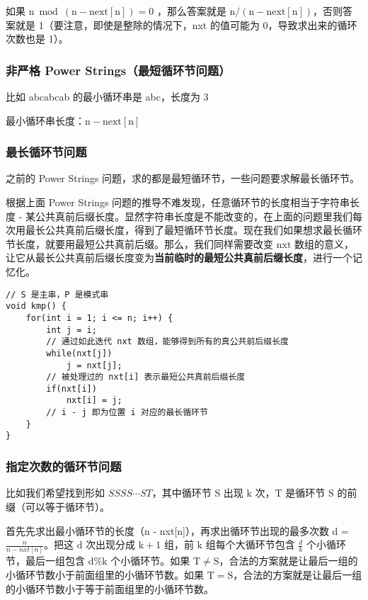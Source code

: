 \documentclass[UTF8]{article}
\begin{document}
如果 $\mathrm{n \bmod (n - next[n]) = 0}$  ，那么答案就是 $\mathrm{n / (n - next[n])}$，否则答案就是 1（要注意，即使是整除的情况下，nxt 的值可能为 0，导致求出来的循环次数也是 1）。

\subsubsection{非严格 Power Strings（最短循环节问题）}
比如 abcabcab 的最小循环串是 abc，长度为 $\mathrm{3}$

最小循环串长度：$\mathrm{n-next[n]}$

\subsubsection{最长循环节问题}
之前的 Power Strings 问题，求的都是最短循环节，一些问题要求解最长循环节。

根据上面 Power Strings 问题的推导不难发现，任意循环节的长度相当于字符串长度 - 某公共真前后缀长度。显然字符串长度是不能改变的，在上面的问题里我们每次用最长公共真前后缀长度，得到了最短循环节长度。现在我们如果想求最长循环节长度，就要用最短公共真前后缀。那么，我们同样需要改变 $\mathrm{nxt}$ 数组的意义，让它从最长公共真前后缀长度变为\textbf{当前临时的最短公共真前后缀长度}，进行一个记忆化。

\begin{lstlisting}[caption=最长循环节问题]
// S 是主串，P 是模式串
void kmp() {
	for(int i = 1; i <= n; i++) {
		int j = i;
		// 通过如此迭代 nxt 数组，能够得到所有的真公共前后缀长度
		while(nxt[j])
			j = nxt[j];
		// 被处理过的 nxt[i] 表示最短公共真前后缀长度
		if(nxt[i])
			nxt[i] = j;
		// i - j 即为位置 i 对应的最长循环节
	}
}
\end{lstlisting}


\subsubsection{指定次数的循环节问题}
比如我们希望找到形如 ${SSSS \cdots ST}$，其中循环节 $\mathrm{S}$ 出现 $\mathrm{k}$ 次，$\mathrm{T}$ 是循环节 $\mathrm{S}$ 的前缀（可以等于循环节）。

首先先求出最小循环节的长度（n - nxt[n]），再求出循环节出现的最多次数 d = $\frac{n}{n - nxt[n]}$。把这 $\mathrm{d}$ 次出现分成 $\mathrm{k + 1}$ 组，前 $\mathrm{k}$ 组每个大循环节包含 $\frac{d}{k}$ 个小循环节，最后一组包含 $\mathrm{d \% k}$ 个小循环节。如果 $\mathrm{T \neq S}$，合法的方案就是让最后一组的小循环节数小于前面组里的小循环节数。如果 $\mathrm{T = S}$，合法的方案就是让最后一组的小循环节数小于等于前面组里的小循环节数。
\end{document}
